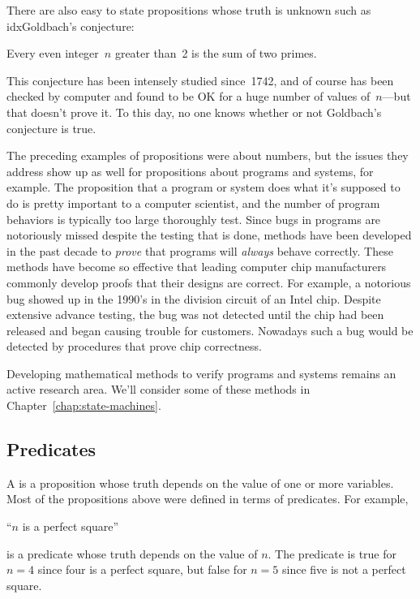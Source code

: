 There are also easy to state propositions whose truth is unknown such
as idx{Goldbach's conjecture}:
\begin{proposition}[Goldbach]
Every even integer~$n$ greater than~2 is the sum of two primes.
\end{proposition}
This conjecture has been intensely studied since~1742, and of course
has been checked by computer and found to be OK for a huge number of
values of~$n$---but that doesn't prove it.  To this day, no one knows
whether or not Goldbach's conjecture is true.

The preceding examples of propositions were about numbers, but the
issues they address show up as well for propositions about programs
and systems, for example.  The proposition that a program or system
does what it's supposed to do is pretty important to a computer
scientist, and the number of program behaviors is typically too large
thoroughly test.  Since bugs in programs are notoriously missed
despite the testing that is done, methods have been developed in the
past decade to \emph{prove} that programs will \emph{always} behave
correctly.  These methods have become so effective that leading
computer chip manufacturers commonly develop proofs that their designs
are correct.  For example, a notorious bug showed up in the 1990's in
the division circuit of an Intel chip.  Despite extensive advance
testing, the bug was not detected until the chip had been released and
began causing trouble for customers.  Nowadays such a bug would be
detected by procedures that prove chip correctness.

Developing mathematical methods to verify programs and systems remains
an active research area.  We'll consider some of these methods in
Chapter~\ref{chap:state-machines}.

\begin{problems}
\practiceproblems
{}

\homeworkproblems
{}

\iffalse
\begin{editingnotes}
insert 4-coloring checker formula/circuit problem
\end{editingnotes}
\fi

\end{problems}

\subsection{Predicates}
A  is a proposition whose truth depends on the value of
one or more variables.  Most of the propositions above were defined in
terms of predicates.  For example,
%
\begin{center}
``$n$ is a perfect square''
\end{center}
%
is a predicate whose truth depends on the value of $n$.  The predicate is
true for $n = 4$ since four is a perfect square, but false for $n = 5$
since five is not a perfect square.

